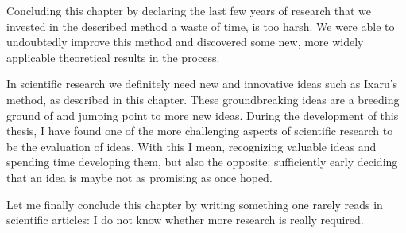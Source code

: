 Concluding this chapter by declaring the last few years of research that we invested in the described method a waste of time, is too harsh. We were able to undoubtedly improve this method and discovered some new, more widely applicable theoretical results in the process.

In scientific research we definitely need new and innovative ideas such as Ixaru's method, as described in this chapter. These groundbreaking ideas are a breeding ground of and jumping point to more new ideas. During the development of this thesis, I have found one of the more challenging aspects of scientific research to be the evaluation of ideas. With this I mean, recognizing valuable ideas and spending time developing them, but also the opposite: sufficiently early deciding that an idea is maybe not as promising as once hoped.

Let me finally conclude this chapter by writing something one rarely reads in scientific articles: I do not know whether more research is really required.

\stopchapter
